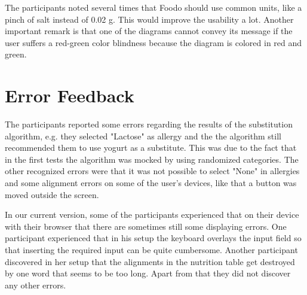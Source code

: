 
The participants noted several times that Foodo should use common units, like a pinch of salt instead of 0.02 g. This would improve the usability a lot. Another important remark is that one of the diagrams cannot convey its message if the user suffers a red-green color blindness because the diagram is colored in red and green. 

\section{Error Feedback}


The participants reported some errors regarding the results of the substitution algorithm, e.g. they selected "Lactose" as allergy and the the algorithm still recommended them to use yogurt as a substitute. This was due to the fact that in the first tests the algorithm was mocked by using randomized categories. The other recognized errors were that it was not possible to select "None" in allergies and some alignment errors on some of the user's devices, like that a button was moved outside the screen.


In our current version, some of the participants experienced that on their  device with their browser that there are sometimes still some displaying errors. One participant experienced that in his setup the keyboard overlays the input field so that inserting the required input can be quite cumbersome. Another participant discovered in her setup that the alignments in the nutrition table get destroyed by one word that seems to be too long. Apart from that they did not discover any other errors.


